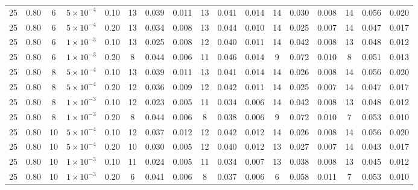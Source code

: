 \begin{longtable}{c c c c c c c c c c c c c c c c c }
25 & 0.80 & 6 & $5{\times}10^{-4}$ & 0.10 & 13 & 0.039 & 0.011 & 13 & 0.041 & 0.014 & 14 & 0.030 & 0.008 & 14 & 0.056 & 0.020 \\
25 & 0.80 & 6 & $5{\times}10^{-4}$ & 0.20 & 13 & 0.034 & 0.008 & 13 & 0.044 & 0.010 & 14 & 0.025 & 0.007 & 14 & 0.047 & 0.017 \\
25 & 0.80 & 6 & $1{\times}10^{-3}$ & 0.10 & 13 & 0.025 & 0.008 & 12 & 0.040 & 0.011 & 14 & 0.042 & 0.008 & 13 & 0.048 & 0.012 \\
25 & 0.80 & 6 & $1{\times}10^{-3}$ & 0.20 & 8 & 0.044 & 0.006 & 11 & 0.046 & 0.014 & 9 & 0.072 & 0.010 & 8 & 0.051 & 0.013 \\
25 & 0.80 & 8 & $5{\times}10^{-4}$ & 0.10 & 13 & 0.039 & 0.011 & 13 & 0.041 & 0.014 & 14 & 0.026 & 0.008 & 14 & 0.056 & 0.020 \\
25 & 0.80 & 8 & $5{\times}10^{-4}$ & 0.20 & 12 & 0.036 & 0.009 & 12 & 0.042 & 0.011 & 14 & 0.025 & 0.007 & 14 & 0.047 & 0.017 \\
25 & 0.80 & 8 & $1{\times}10^{-3}$ & 0.10 & 12 & 0.023 & 0.005 & 11 & 0.034 & 0.006 & 14 & 0.042 & 0.008 & 13 & 0.048 & 0.012 \\
25 & 0.80 & 8 & $1{\times}10^{-3}$ & 0.20 & 8 & 0.044 & 0.006 & 8 & 0.038 & 0.006 & 9 & 0.072 & 0.010 & 7 & 0.053 & 0.010 \\
25 & 0.80 & 10 & $5{\times}10^{-4}$ & 0.10 & 12 & 0.037 & 0.012 & 12 & 0.042 & 0.012 & 14 & 0.026 & 0.008 & 14 & 0.056 & 0.020 \\
25 & 0.80 & 10 & $5{\times}10^{-4}$ & 0.20 & 10 & 0.030 & 0.005 & 12 & 0.040 & 0.012 & 13 & 0.027 & 0.007 & 14 & 0.043 & 0.017 \\
25 & 0.80 & 10 & $1{\times}10^{-3}$ & 0.10 & 11 & 0.024 & 0.005 & 11 & 0.034 & 0.007 & 13 & 0.038 & 0.008 & 13 & 0.045 & 0.012 \\
25 & 0.80 & 10 & $1{\times}10^{-3}$ & 0.20 & 6 & 0.041 & 0.006 & 8 & 0.037 & 0.006 & 6 & 0.058 & 0.011 & 7 & 0.053 & 0.010 \\
\end{longtable}\endgroup
